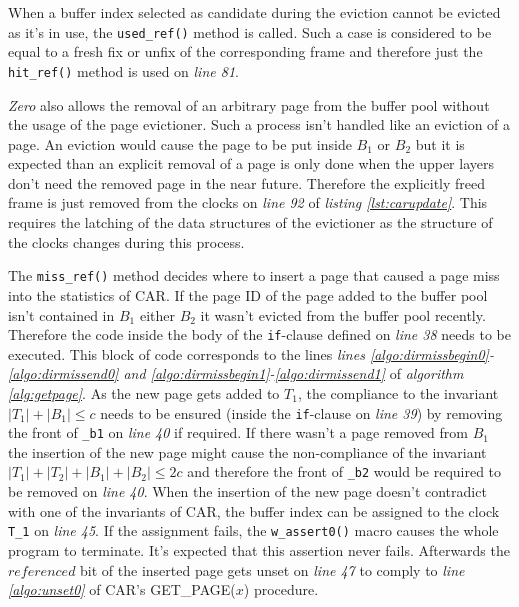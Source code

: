     When a buffer index selected as candidate during the eviction cannot be evicted as it's in use, the \lstinline{used_ref()} method is called. Such a case is considered to be equal to a fresh fix or unfix of the corresponding frame and therefore just the \lstinline{hit_ref()} method is used on \emph{line 81}.

    \emph{Zero} also allows the removal of an arbitrary page from the buffer pool without the usage of the page evictioner. Such a process isn't handled like an eviction of a page. An eviction would cause the page to be put inside $B_1$ or $B_2$ but it is expected than an explicit removal of a page is only done when the upper layers don't need the removed page in the near future. Therefore the explicitly freed frame is just removed from the clocks on \emph{line 92} of \emph{listing \ref{lst:carupdate}}. This requires the latching of the data structures of the evictioner as the structure of the clocks changes during this process.

    The \lstinline{miss_ref()} method decides where to insert a page that caused a page miss into the statistics of CAR. If the page ID of the page added to the buffer pool isn't contained in $B_1$ either $B_2$ it wasn't evicted from the buffer pool recently. Therefore the code inside the body of the \lstinline{if}-clause defined on \emph{line 38} needs to be executed. This block of code corresponds to the lines \emph{lines \ref{algo:dirmissbegin0}-\ref{algo:dirmissend0} and \ref{algo:dirmissbegin1}-\ref{algo:dirmissend1}} of \emph{algorithm \ref{alg:getpage}}. As the new page gets added to $T_1$, the compliance to the invariant $\left|T_1\right| + \left|B_1\right| \leq c$ needs to be ensured (inside the \lstinline{if}-clause on \emph{line 39}) by removing the front of \lstinline{_b1} on \emph{line 40} if required. If there wasn't a page removed from $B_1$ the insertion of the new page might cause the non-compliance of the invariant $\left|T_1\right| + \left|T_2\right| + \left|B_1\right| + \left|B_2\right| \leq 2c$ and therefore the front of \lstinline{_b2} would be required to be removed on \emph{line 40}. When the insertion of the new page doesn't contradict with one of the invariants of CAR, the buffer index can be assigned to the clock \lstinline{T_1} on \emph{line 45}. If the assignment fails, the \lstinline{w_assert0()} macro causes the whole program to terminate. It's expected that this assertion never fails. Afterwards the $referenced$ bit of the inserted page gets unset on \emph{line 47} to comply to \emph{line \ref{algo:unset0}} of CAR's GET\_PAGE($x$) procedure.

